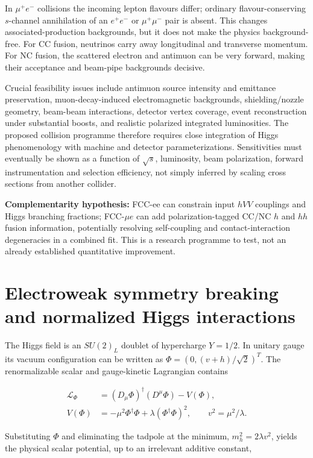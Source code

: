 \documentclass[12pt,a4paper]{article}
\newcommand{\newnote}{\clearpage}
\begin{document}
In $\mu^+e^-$ collisions the incoming lepton flavours differ; ordinary flavour-conserving $s$-channel annihilation of an $e^+e^-$ or $\mu^+\mu^-$ pair is absent. This changes associated-production backgrounds, but it does not make the physics background-free. For CC fusion, neutrinos carry away longitudinal and transverse momentum. For NC fusion, the scattered electron and antimuon can be very forward, making their acceptance and beam-pipe backgrounds decisive.

Crucial feasibility issues include antimuon source intensity and emittance preservation, muon-decay-induced electromagnetic backgrounds, shielding/nozzle geometry, beam-beam interactions, detector vertex coverage, event reconstruction under substantial boosts, and realistic polarized integrated luminosities. The proposed collision programme therefore requires close integration of Higgs phenomenology with machine and detector parameterizations. Sensitivities must eventually be shown as a function of $\sqrt{s}$, luminosity, beam polarization, forward instrumentation and selection efficiency, not simply inferred by scaling cross sections from another collider.

\textbf{Complementarity hypothesis:} FCC-ee can constrain input $hVV$ couplings and Higgs branching fractions; FCC-$\mu e$ can add polarization-tagged CC/NC $h$ and $hh$ fusion information, potentially resolving self-coupling and contact-interaction degeneracies in a combined fit. This is a research programme to test, not an already established quantitative improvement.



\newnote

\section{Electroweak symmetry breaking and normalized Higgs interactions}

The Higgs field is an $SU(2)_L$ doublet of hypercharge $Y=1/2$. In unitary gauge its vacuum configuration can be written as $\Phi=(0,(v+h)/\sqrt2)^T$. The renormalizable scalar and gauge-kinetic Lagrangian contains

\begin{align}
\mathcal L_\Phi&=(D_\mu\Phi)^\dagger(D^\mu\Phi)-V(\Phi),\\
V(\Phi)&=-\mu^2\Phi^\dagger\Phi+\lambda(\Phi^\dagger\Phi)^2,
\qquad v^2=\mu^2/\lambda.
\end{align}

Substituting $\Phi$ and eliminating the tadpole at the minimum, $m_h^2=2\lambda v^2$, yields the physical scalar potential, up to an irrelevant additive constant,
\end{document}
